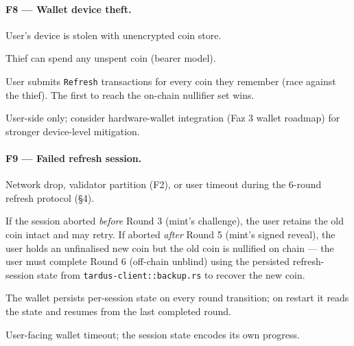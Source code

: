 \paragraph{F8 --- Wallet device theft.}
\begin{description}[leftmargin=2em,style=nextline,itemsep=0pt]
  \item[Trigger] User's device is stolen with unencrypted coin store.
  \item[Consequence] Thief can spend any unspent coin (bearer model).
  \item[Recovery] User submits \texttt{Refresh} transactions for every
    coin they remember (race against the thief). The first to reach
    the on-chain nullifier set wins.
  \item[Detection] User-side only; consider hardware-wallet integration
    (Faz 3 wallet roadmap) for stronger device-level mitigation.
\end{description}

\paragraph{F9 --- Failed refresh session.}
\begin{description}[leftmargin=2em,style=nextline,itemsep=0pt]
  \item[Trigger] Network drop, validator partition (F2), or user
    timeout during the 6-round refresh protocol (\S4).
  \item[Consequence] If the session aborted \emph{before} Round 3
    (mint's challenge), the user retains the old coin intact and may
    retry. If aborted \emph{after} Round 5 (mint's signed reveal),
    the user holds an unfinalised new coin but the old coin is
    nullified on chain — the user must complete Round 6 (off-chain
    unblind) using the persisted refresh-session state from
    \texttt{tardus-client::backup.rs} to recover the new coin.
  \item[Recovery] The wallet persists per-session state on every round
    transition; on restart it reads the state and resumes from the
    last completed round.
  \item[Detection] User-facing wallet timeout; the session state
    encodes its own progress.
\end{description}

